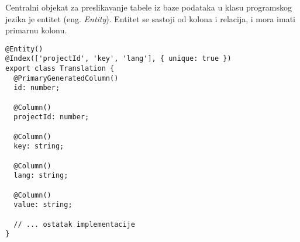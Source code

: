 Centralni objekat za preslikavanje tabele iz baze podataka u klasu programskog jezika je entitet (eng. \textit{Entity}).
Entitet se sastoji od kolona i relacija, i mora imati primarnu kolonu.

\begin{verbatim}
@Entity()
@Index(['projectId', 'key', 'lang'], { unique: true })
export class Translation {
  @PrimaryGeneratedColumn()
  id: number;
	
  @Column()
  projectId: number;
	
  @Column()
  key: string;
		
  @Column()
  lang: string;
	
  @Column()
  value: string;

  // ... ostatak implementacije
}
\end{verbatim}
